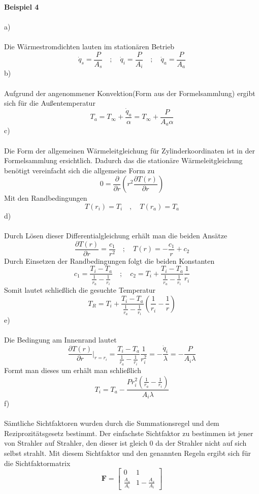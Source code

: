 \textbf{Beispiel 4}\\ \\
a)\\ \\
Die Wärmestromdichten lauten im stationären Betrieb
\[
	\dot{q}_s = \frac{P}{A_s} \quad;\quad \dot{q}_i = \frac{P}{A_i} \quad;\quad \dot{q}_a = \frac{P}{A_a}
\]
b)\\ \\
Aufgrund der angenommener Konvektion(Form aus der Formelsammlung) ergibt sich für die Außentemperatur
\[
	T_a = T_\infty + \frac{\dot{q}_a}{\alpha} = T_\infty + \frac{P}{A_a\alpha}
\]
c)\\ \\
Die Form der allgemeinen Wärmeleitgleichung für Zylinderkoordinaten ist in der Formelsammlung ersichtlich. Dadurch das die stationäre Wärmeleitgleichung benötigt vereinfacht sich die allgemeine Form zu
\[
	0 = \frac{\partial}{\partial r}\left(r^2\frac{\partial T(r)}{\partial r}\right)
\]
Mit den Randbedingungen
\[
	T(r_i) = T_i \quad,\quad T(r_a) = T_a
\]
d) \\ \\
Durch Lösen dieser Differentialgleichung erhält man die beiden Ansätze
\[
	\frac{\partial T(r)}{\partial r} = \frac{c_1}{r^2} \quad;\quad T(r) = -\frac{c_1}{r} + c_2
\]
Durch Einsetzen der Randbedingungen folgt die beiden Konstanten 
\[
	c_1 = \frac{T_i - T_a}{\frac{1}{r_a} - \frac{1}{r_i}} \quad;\quad c_2 = T_i + \frac{T_i - T_a}{\frac{1}{r_a} - \frac{1}{r_i}}\frac{1}{r_i}
\]
Somit lautet schließlich die gesuchte Temperatur
\[
	T_R = T_i + \frac{T_i - T_a}{\frac{1}{r_a} - \frac{1}{r_i}}\left(\frac{1}{r_i} - \frac{1}{r}\right)
\]
e)\\ \\
Die Bedingung am Innenrand lautet
\[
	\frac{\partial T(r)}{\partial r}\Biggl|_{r = r_i} = \frac{T_i - T_a}{\frac{1}{r_a} - \frac{1}{r_i}}\frac{1}{r_i^2} = -\frac{\dot{q}_i}{\lambda} = -\frac{P}{A_i\lambda}
\]
Formt man dieses um erhält man schließlich
\[
	T_i = T_a - \frac{Pr_i^2\left(\frac{1}{r_a} - \frac{1}{r_i}\right)}{A_i\lambda}
\]
f) \\ \\
Sämtliche Sichtfaktoren wurden durch die Summationsregel und dem Reziprozitätsgesetz bestimmt. Der einfachste Sichtfaktor zu bestimmen ist jener von Strahler auf Strahler, den dieser ist gleich 0 da der Strahler nicht auf sich selbst strahlt. Mit diesem Sichtfaktor und den genannten Regeln ergibt sich für die Sichtfaktormatrix
\[
	\textbf{F} = \begin{bmatrix}
		0 & 1 \\
		\frac{A_s}{A_i} & 1 - \frac{A_s}{A_i}
	\end{bmatrix}
\]
